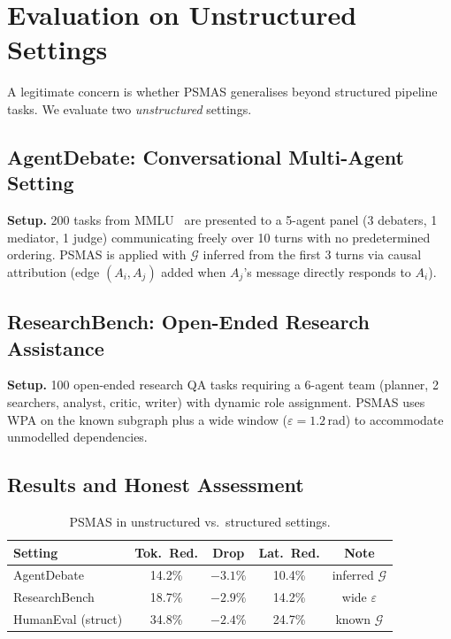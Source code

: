 \documentclass[10pt,twocolumn]{article}
\theoremstyle{plain}
\theoremstyle{definition}
\theoremstyle{remark}
\newcommand{\G}{\mathcal{G}}
\newcommand{\eps}{\varepsilon}
\begin{document}
\section{Evaluation on Unstructured Settings}
\label{sec:unstructured}

A legitimate concern is whether PSMAS generalises beyond structured
pipeline tasks.  We evaluate two \emph{unstructured} settings.

\subsection{AgentDebate: Conversational Multi-Agent Setting}

\textbf{Setup.}  200 tasks from MMLU~\citep{hendrycks2020measuring}
are presented to a 5-agent panel (3 debaters, 1 mediator, 1 judge)
communicating freely over 10 turns with no predetermined ordering.
PSMAS is applied with $\G$ inferred from the first 3 turns via causal
attribution (edge $(A_i,A_j)$ added when $A_j$'s message directly
responds to $A_i$).

\subsection{ResearchBench: Open-Ended Research Assistance}

\textbf{Setup.}  100 open-ended research QA tasks requiring a 6-agent
team (planner, 2 searchers, analyst, critic, writer) with dynamic role
assignment.  PSMAS uses WPA on the known subgraph plus a wide window
($\eps=1.2$\,rad) to accommodate unmodelled dependencies.

\subsection{Results and Honest Assessment}

\begin{table}[h]
\centering\scriptsize
\caption{PSMAS in unstructured vs.\ structured settings.}
\label{tab:unstructured}
\setlength{\tabcolsep}{3pt}
\begin{tabular}{@{}lcccc@{}}
\toprule
\textbf{Setting} & \textbf{Tok.\ Red.} & \textbf{Drop} & \textbf{Lat.\ Red.} & \textbf{Note}\\
\midrule
AgentDebate      & 14.2\% & $-3.1\%$ & 10.4\% & inferred $\G$\\
ResearchBench    & 18.7\% & $-2.9\%$ & 14.2\% & wide $\eps$\\
\midrule
HumanEval (struct)& 34.8\% & $-2.4\%$ & 24.7\% & known $\G$\\
\bottomrule
\end{tabular}
\end{table}
\end{document}
